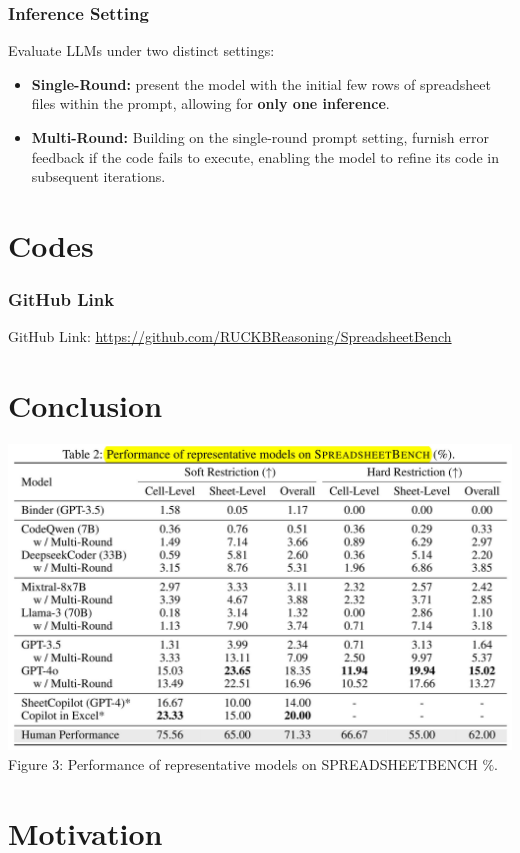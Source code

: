\documentclass{beamer}
\begin{document}
\begin{frame}
    \frametitle{Inference Setting}
    Evaluate LLMs under two distinct settings:
    \begin{itemize}
        \item \textbf{Single-Round:} present the model with the initial few rows of spreadsheet files within the prompt, allowing for \textbf{only one inference}.
        \item \textbf{Multi-Round:} Building on the single-round prompt setting, furnish error feedback if the code fails to execute, enabling the model to refine its code in subsequent iterations.
    \end{itemize}
\end{frame}

\section{Codes}
\begin{frame}
    \frametitle{GitHub Link}
    GitHub Link: \href{https://github.com/RUCKBReasoning/SpreadsheetBench}{https://github.com/RUCKBReasoning/SpreadsheetBench}
\end{frame}

\section{Conclusion}
\begin{frame}
    \centering
    \includegraphics[width=1\linewidth]{pic/performance.jpg}
    \vspace{0.2cm}
    {\footnotesize Figure 3: Performance of representative models on SPREADSHEETBENCH \(\%\).}
\end{frame}

\section{Motivation}
\end{document}
